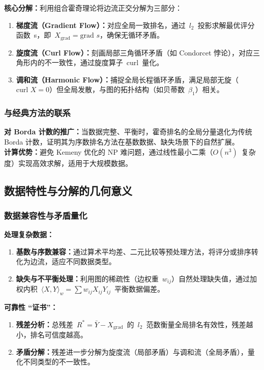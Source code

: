 \documentclass[a4paper]{article}
\begin{document}
\indent \textbf{核心分解：}利用组合霍奇理论将边流正交分解为三部分：
\begin{enumerate}
    \item \textbf{梯度流（Gradient Flow）：}对应全局一致排名，通过 \(l_2\) 投影求解最优评分函数 s，即 \(X_{\text{grad}} = \text{grad } s\)，确保无循环矛盾。
    \item \textbf{旋度流（Curl Flow）：}刻画局部三角循环矛盾（如 Condorcet 悖论），对应三角形内的不一致性，通过旋度算子 \(\text{curl}\) 量化。
    \item \textbf{调和流（Harmonic Flow）：}捕捉全局长程循环矛盾，满足局部无旋（\(\text{curl } X = 0\)）但全局发散，与图的拓扑结构（如贝蒂数 \(\beta_1\)）相关。
\end{enumerate}

\subsubsection{与经典方法的联系}
\indent \textbf{对 Borda 计数的推广：}当数据完整、平衡时，霍奇排名的全局分量退化为传统Borda 计数，证明其为序数排名方法在基数数据、缺失场景下的自然扩展。\\
\indent \textbf{计算优势：}避免 Kemeny 优化的 NP 难问题，通过线性最小二乘（\(O(n^3)\) 复杂度）实现高效求解，适用于大规模数据。

\subsection{数据特性与分解的几何意义}
\subsubsection{数据兼容性与矛盾量化}
\indent \textbf{处理复杂数据：}
\begin{enumerate}
    \item \textbf{基数与序数兼容：}通过算术平均差、二元比较等预处理方法，将评分或排序转化为边流，适应不同数据类型。
    \item \textbf{缺失与不平衡处理：}利用图的稀疏性（边权重 \(w_{ij}\)）自然处理缺失值，通过加权内积 \(\langle X, Y \rangle_w = \sum w_{ij}X_{ij}Y_{ij}\) 平衡数据偏差。
\end{enumerate}
\indent \textbf{可靠性 “证书”：}
\begin{enumerate}
    \item \textbf{残差分析：}总残差 \(R^* = \bar{Y} - X_{\text{grad}}\) 的 \(l_2\) 范数衡量全局排名有效性，残差越小，排名可信度越高。
    \item \textbf{矛盾分解：}残差进一步分解为旋度流（局部矛盾）与调和流（全局矛盾），量化不同类型的不一致性。
\end{enumerate}
\end{document}
